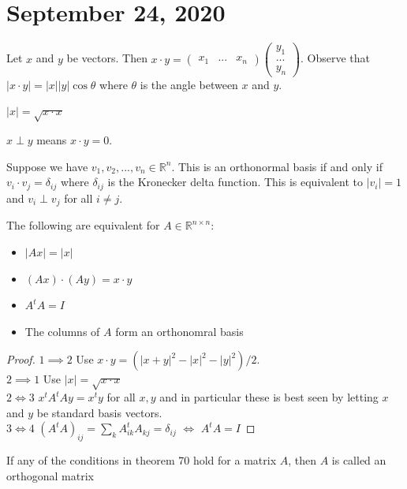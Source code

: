 \documentclass{article}
\newcommand{\R}{\mathbb{R}}
\begin{document}
\section{September 24, 2020}
\begin{definition}
Let $x$ and $y$ be vectors. Then $x\cdot y=\begin{pmatrix}
x_1&...&x_n
\end{pmatrix}\begin{pmatrix}
y_1\\...\\y_n
\end{pmatrix}$. Observe that $|x\cdot y|=|x||y|\cos\theta$ where $\theta$ is the angle between $x$ and $y$.
\end{definition}
\begin{definition}
$|x|=\sqrt{x\cdot x}$
\end{definition}
\begin{definition}
$x\perp y$ means $x\cdot y=0$.
\end{definition}
\begin{definition}
Suppose we have $v_1,v_2,...,v_n\in \R^n$. This is an orthonormal basis if and only if $v_i\cdot v_j=\delta_{ij}$ where $\delta_{ij}$ is the Kronecker delta function. This is equivalent to $|v_i|=1$ and $v_i\perp v_j$ for all $i\neq j$.
\end{definition}
\begin{theorem}
The following are equivalent for $A\in \R^{n\times n}$:
\begin{itemize}
    \item $|Ax|=|x|$
    \item $(Ax)\cdot(Ay)=x\cdot y$
    \item $A^tA=I$
    \item The columns of $A$ form an orthonomral basis
\end{itemize}
\end{theorem}
\begin{proof}
$1\implies 2$ Use $x\cdot y=(|x+y|^2-|x|^2-|y|^2)/2$.\\
$2\implies 1$ Use $|x|=\sqrt{x\cdot x}$\\
$2\iff 3$ $x^tA^tAy=x^ty$ for all $x,y$ and in particular these is best seen by letting $x$ and $y$ be standard basis vectors.\\
$3\iff 4$ $(A^tA)_{ij}=\sum_k A^t_{ik}A_{kj}=\delta_{ij}$ $\iff$ $A^tA=I$
\end{proof}
\begin{definition}
If any of the conditions in theorem 70 hold for a matrix $A$, then $A$ is called an orthogonal matrix
\end{definition}
\end{document}
